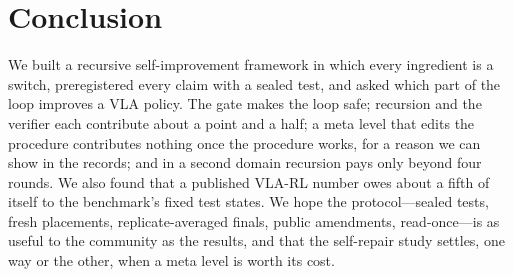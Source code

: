 \section{Conclusion}
\label{sec:conclusion}

We built a recursive self-improvement framework in which every ingredient is a switch, preregistered every claim with a sealed test, and asked which part of the loop improves a VLA policy. The gate makes the loop safe; recursion and the verifier each contribute about a point and a half; a meta level that edits the procedure contributes nothing once the procedure works, for a reason we can show in the records; and in a second domain recursion pays only beyond four rounds. We also found that a published VLA-RL number owes about a fifth of itself to the benchmark's fixed test states. We hope the protocol---sealed tests, fresh placements, replicate-averaged finals, public amendments, read-once---is as useful to the community as the results, and that the self-repair study settles, one way or the other, when a meta level is worth its cost.
